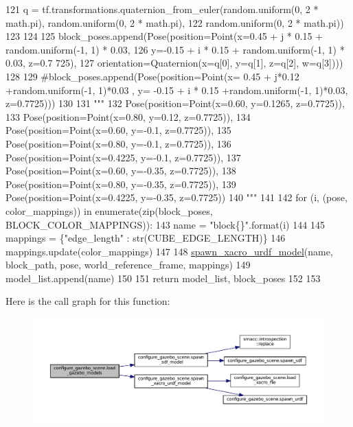 \begin{DoxyCode}
121             q = tf.transformations.quaternion\_from\_euler(random.uniform(0, 2 * math.pi), random.uniform(0, 
      2 * math.pi),
122                                                          random.uniform(0, 2 * math.pi))
123 
124 
125             block\_poses.append(Pose(position=Point(x=0.45 + j * 0.15 + random.uniform(-1, 1) * 0.03,
126                                                    y=-0.15 + i * 0.15 + random.uniform(-1, 1) * 0.03, z=0.7
      725),
127                                     orientation=Quaternion(x=q[0], y=q[1], z=q[2], w=q[3])))
128 
129             \textcolor{comment}{#block\_poses.append(Pose(position=Point(x= 0.45 + j*0.12 +random.uniform(-1, 1)*0.03 , y= -0.15
       + i * 0.15 +random.uniform(-1, 1)*0.03, z=0.7725)))}
130 
131     \textcolor{stringliteral}{"""}
132 \textcolor{stringliteral}{    Pose(position=Point(x=0.60, y=0.1265, z=0.7725)),}
133 \textcolor{stringliteral}{    Pose(position=Point(x=0.80, y=0.12, z=0.7725)),}
134 \textcolor{stringliteral}{    Pose(position=Point(x=0.60, y=-0.1, z=0.7725)),}
135 \textcolor{stringliteral}{    Pose(position=Point(x=0.80, y=-0.1, z=0.7725)),}
136 \textcolor{stringliteral}{    Pose(position=Point(x=0.4225, y=-0.1, z=0.7725)),}
137 \textcolor{stringliteral}{    Pose(position=Point(x=0.60, y=-0.35, z=0.7725)),}
138 \textcolor{stringliteral}{    Pose(position=Point(x=0.80, y=-0.35, z=0.7725)),}
139 \textcolor{stringliteral}{    Pose(position=Point(x=0.4225, y=-0.35, z=0.7725))}
140 \textcolor{stringliteral}{    """}
141 
142     \textcolor{keywordflow}{for} (i, (pose, color\_mappings)) \textcolor{keywordflow}{in} enumerate(zip(block\_poses, BLOCK\_COLOR\_MAPPINGS)):
143         name = \textcolor{stringliteral}{"block\{\}"}.format(i)
144 
145         mappings = \{\textcolor{stringliteral}{"edge\_length"} : str(CUBE\_EDGE\_LENGTH)\}
146         mappings.update(color\_mappings)
147 
148         \hyperlink{namespaceconfigure__gazebo__scene_ab316a0c48017b0f2f926f3bdcb3563bf}{spawn\_xacro\_urdf\_model}(name, block\_path, pose, world\_reference\_frame, 
      mappings)
149         model\_list.append(name)
150 
151     \textcolor{keywordflow}{return} model\_list, block\_poses
152 
153 
\end{DoxyCode}


Here is the call graph for this function\+:
\nopagebreak
\begin{figure}[H]
\begin{center}
\leavevmode
\includegraphics[width=350pt]{namespaceconfigure__gazebo__scene_a1de44bc5d9559c667441cfb56a72f519_cgraph}
\end{center}
\end{figure}




